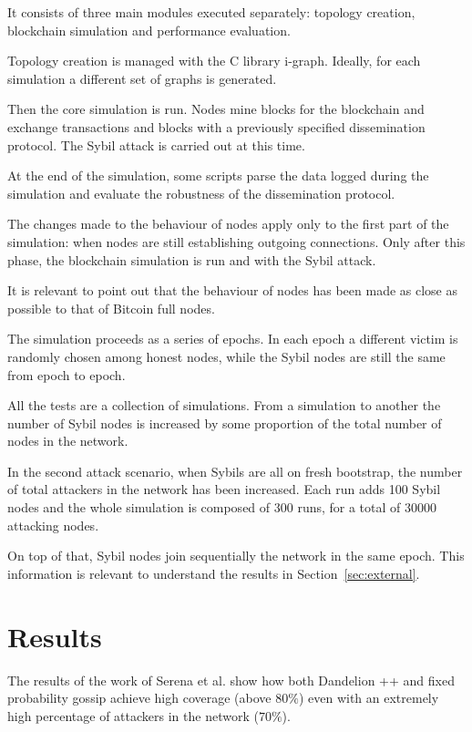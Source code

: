 \documentclass[12pt, letterpaper, twoside]{article}
\begin{document}
It consists of three main modules executed separately: topology creation, blockchain simulation and performance evaluation.

Topology creation is managed with the C library i-graph. Ideally, for each simulation a different set of graphs is generated.

Then the core simulation is run. Nodes mine blocks for the blockchain and exchange transactions and blocks with a previously specified dissemination protocol. The Sybil attack is carried out at this time.

At the end of the simulation, some scripts parse the data logged during the simulation and evaluate the robustness of the dissemination protocol.

The changes made to the behaviour of nodes apply only to the first part of the simulation: when nodes are still establishing outgoing connections. Only after this phase, the blockchain simulation is run and with the Sybil attack.

It is relevant to point out that the behaviour of nodes has been made as close as possible to that of Bitcoin full nodes.

The simulation proceeds as a series of epochs. In each epoch a different victim is randomly chosen among honest nodes, while the Sybil nodes are still the same from epoch to epoch.

All the tests are a collection of simulations. From a simulation to another the number of Sybil nodes is increased by some proportion of the total number of nodes in the network.

In the second attack scenario, when Sybils are all on fresh bootstrap, the number of total attackers in the network has been increased. Each run adds 100 Sybil nodes and the whole simulation is composed of 300 runs, for a total of 30000 attacking nodes.

On top of that, Sybil nodes join sequentially the network in the same epoch. This information is relevant to understand the results in Section~\ref{sec:external}.

\section{Results}\label{sec:res}
The results of the work of Serena et al. show how both Dandelion ++ and fixed probability gossip achieve high coverage (above $80\%$) even with an extremely high percentage of attackers in the network ($70\%$)\cite{lunes-dissemination}.
\end{document}
